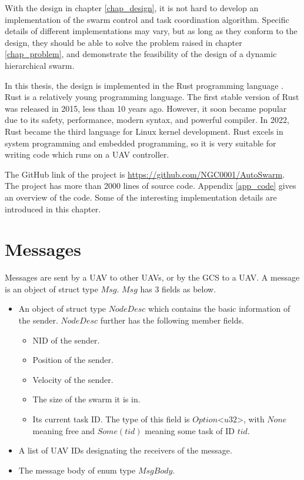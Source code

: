 With the design in chapter \ref{chap_design},
it is not hard to develop an implementation of
the swarm control and task coordination algorithm.
Specific details of different implementations may vary,
but as long as they conform to the design,
they should be able to solve the problem raised in chapter \ref{chap_problem},
and demonstrate the feasibility of the design of a dynamic hierarchical swarm.

In this thesis, the design is implemented in the Rust programming language \parencite{Rust}.
Rust is a relatively young programming language.
The first stable version of Rust was released in 2015, less than 10 years ago.
However, it soon became popular due to its safety, performance,
modern syntax, and powerful compiler.
In 2022, Rust became the third language for Linux kernel development.
Rust excels in system programming and embedded programming,
so it is very suitable for writing code which runs on a UAV controller.

The GitHub link of the project is \url{https://github.com/NGC0001/AutoSwarm}.
The project has more than 2000 lines of source code.
Appendix \ref{app_code} gives an overview of the code.
Some of the interesting implementation details are introduced in this chapter.

\section{Messages}

Messages are sent by a UAV to other UAVs, or by the GCS to a UAV.
A message is an object of struct type $Msg$.
$Msg$ has 3 fields as below.
\begin{itemize}
    \item An object of struct type $NodeDesc$
          which contains the basic information of the sender.
          $NodeDesc$ further has the following member fields.
          \begin{itemize}
              \item NID of the sender.
              \item Position of the sender.
              \item Velocity of the sender.
              \item The size of the swarm it is in.
              \item Its current task ID.
                    The type of this field is $Option$<$u32$>,
                    with $None$ meaning free and $Some(tid)$ meaning some task of ID $tid$.
          \end{itemize}
    \item A list of UAV IDs designating the receivers of the message.
    \item The message body of enum type $MsgBody$.
\end{itemize}

